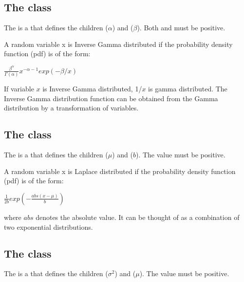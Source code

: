 \subsection{The  class}
\label{InverseGammaDistribution-class}
\label{inversegammadistribution-class}

The \InverseGammaDistribution is a \ContinuousUnivariateDistribution that defines the \UncertValue children  ($\alpha$) and  ($\beta$).  Both  and  must be positive.

A random variable x is Inverse Gamma distributed if the probability density function (pdf) is of the form:

\begin{center}
$\frac{\beta^\alpha}{\Gamma(\alpha)}x^{-\alpha-1}exp(-\beta/x)$
\end{center}

If variable $x$ is Inverse Gamma distributed, 1/$x$ is gamma distributed. The Inverse Gamma distribution function can be obtained from the Gamma distribution by a transformation of variables.

\subsection{The  class}
\label{LaPlaceDistribution-class}
\label{laplacedistribution-class}

The \LaPlaceDistribution is a \ContinuousUnivariateDistribution that defines the \UncertValue children  ($\mu$) and  ($b$).  The  value must be positive.

A random variable x is Laplace distributed if the probability density function (pdf) is of the form:

\begin{center}
$\frac{1}{2b}exp(-\frac{abs(x-\mu)}{b})$
\end{center}

where $abs$ denotes the absolute value. It can be thought of as a combination of two exponential distributions.

\subsection{The  class}
\label{LogNormalDistribution-class}
\label{lognormaldistribution-class}

The \LogNormalDistribution is a \ContinuousUnivariateDistribution that defines the \UncertValue children  ($\sigma^2$) and  ($\mu$).  The  value must be positive.

